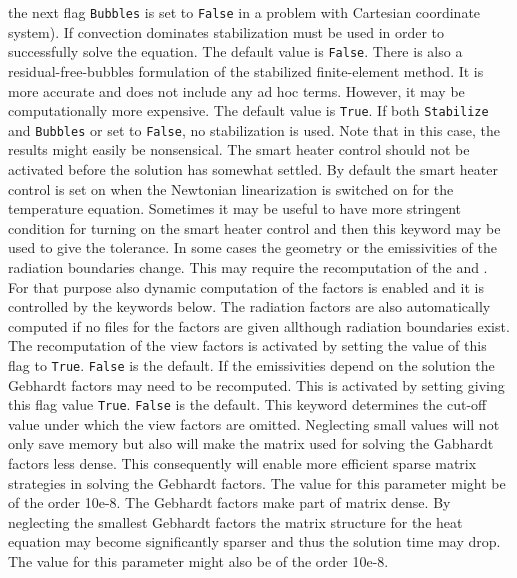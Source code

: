 the next flag {\tt Bubbles} is set to {\tt False} in a problem with Cartesian
coordinate system).
If convection dominates stabilization must be used in order to successfully solve the equation.
The default value is {\tt False}.
There is also a residual-free-bubbles formulation of the stabilized finite-element
method. It is more accurate and does not include any ad hoc terms. However, it may
be computationally more expensive. The default value is {\tt True}.
If both {\tt Stabilize} and {\tt Bubbles} or set to {\tt False}, no stabilization
is used. Note that in this case, the results might easily be nonsensical.
The smart heater control should not be activated before the 
solution has somewhat settled. By default the smart heater 
control is set on when the Newtonian linearization is 
switched on for the temperature equation. Sometimes
it may be useful to have more stringent condition for 
turning on the smart heater control and then this keyword
may be used to give the tolerance. 
%
\sifend
In some cases the geometry or the emissivities of the radiation boundaries 
change. This may require the recomputation of the  and 
. For that purpose also dynamic computation of the factors
is enabled and it is controlled by the keywords below.
The radiation factors are also automatically computed if
no files for the factors are given allthough radiation boundaries
exist. 
\sifbegin
{}
The recomputation of the view factors is activated by 
setting the value of this flag to \texttt{True}.
\texttt{False} is the default.
If the emissivities depend on the solution the Gebhardt factors may need to 
be recomputed. This is activated by setting giving this flag value \texttt{True}.
\texttt{False} is the default.
This keyword determines the cut-off value under which the view factors are
omitted. Neglecting small values will not only save memory but also will
make the matrix used for solving the Gabhardt factors less dense. 
This consequently will enable more efficient sparse matrix strategies
in solving the Gebhardt factors.
The value for this parameter might be of the order 10e-8. 
The Gebhardt factors make part of matrix dense. By neglecting the smallest Gebhardt factors
the matrix structure for the heat equation 
may become significantly sparser and thus the solution time may drop.
The value for this parameter might also be of the order 10e-8. 

